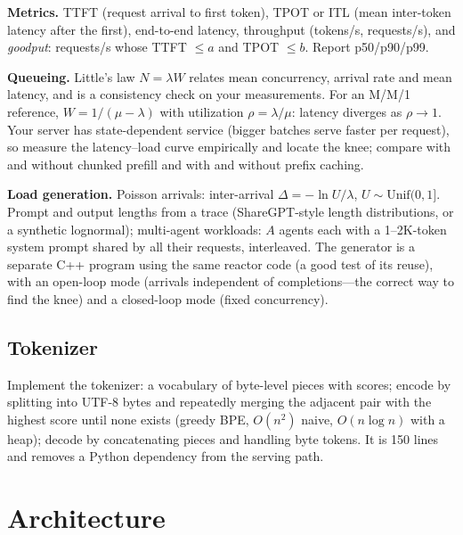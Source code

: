 \textbf{Metrics.} TTFT (request arrival to first token), TPOT or ITL (mean inter-token latency after the first), end-to-end latency, throughput (tokens/s, requests/s), and \emph{goodput}: requests/s whose TTFT $\le a$ and TPOT $\le b$. Report p50/p90/p99.

\textbf{Queueing.} Little's law $N = \lambda W$ relates mean concurrency, arrival rate and mean latency, and is a consistency check on your measurements. For an M/M/1 reference, $W = 1/(\mu - \lambda)$ with utilization $\rho = \lambda/\mu$: latency diverges as $\rho\to1$. Your server has state-dependent service (bigger batches serve faster per request), so measure the latency--load curve empirically and locate the knee; compare with and without chunked prefill and with and without prefix caching.

\textbf{Load generation.} Poisson arrivals: inter-arrival $\Delta = -\ln U/\lambda$, $U\sim\mathrm{Unif}(0,1]$. Prompt and output lengths from a trace (ShareGPT-style length distributions, or a synthetic lognormal); multi-agent workloads: $A$ agents each with a 1--2K-token system prompt shared by all their requests, interleaved. The generator is a separate C++ program using the same reactor code (a good test of its reuse), with an open-loop mode (arrivals independent of completions---the correct way to find the knee) and a closed-loop mode (fixed concurrency).

\subsection{Tokenizer}

Implement the  tokenizer: a vocabulary of byte-level pieces with scores; encode by splitting into UTF-8 bytes and repeatedly merging the adjacent pair with the highest score until none exists (greedy BPE, $O(n^2)$ naive, $O(n\log n)$ with a heap); decode by concatenating pieces and handling  byte tokens. It is 150 lines and removes a Python dependency from the serving path.

\section{Architecture}

